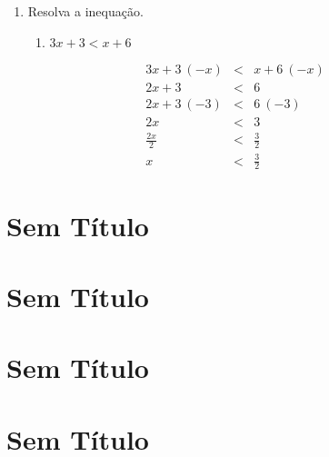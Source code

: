 \documentclass[]{book}
\providecommand{\tightlist}{%
  \setlength{\itemsep}{0pt}\setlength{\parskip}{0pt}}
\begin{document}
\begin{enumerate}
\def\labelenumi{\arabic{enumi}.}
\item
  Resolva a inequação.

  \begin{enumerate}
  \def\labelenumii{\alph{enumii})}
  \tightlist
  \item
    \(3x+3 < x+6\)
  \end{enumerate}
\end{enumerate}

\begin{eqnarray}      
      3x+3 \ (-x) &<& x+6 \ (-x) \nonumber \\
      2x+3 &<& 6 \nonumber \\
      2x+3 \ (-3) &<& 6 \ (-3) \nonumber \\
      2x &<& 3 \nonumber \\
      \frac{2x}{2} &<& \frac{3}{2} \nonumber \\
      x &<& \frac{3}{2} \nonumber
\end{eqnarray}

\chapter{Sem Título}\label{sem-titulo}

\chapter{Sem Título}\label{sem-titulo-1}

\chapter{Sem Título}\label{sem-titulo-2}

\chapter{Sem Título}\label{sem-titulo-3}


\end{document}
